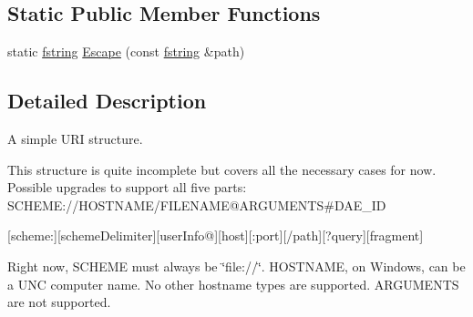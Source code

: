 \subsection*{Static Public Member Functions}
\begin{DoxyCompactItemize}
\item 
static \hyperlink{classfm_1_1stringT}{fstring} \hyperlink{classFUUri_ab0c78a1e1f48983f13aaa5d6d2337efd}{Escape} (const \hyperlink{classfm_1_1stringT}{fstring} \&path)
\end{DoxyCompactItemize}


\subsection{Detailed Description}
A simple URI structure.

This structure is quite incomplete but covers all the necessary cases for now. Possible upgrades to support all five parts: SCHEME://HOSTNAME/FILENAME@ARGUMENTS\#DAE\_\-ID

\mbox{[}scheme:\mbox{]}\mbox{[}schemeDelimiter\mbox{]}\mbox{[}userInfo@\mbox{]}\mbox{[}host\mbox{]}\mbox{[}:port\mbox{]}\mbox{[}/path\mbox{]}\mbox{[}?query\mbox{]}\mbox{[}fragment\mbox{]}

Right now, SCHEME must always be \char`\"{}file://\char`\"{}. HOSTNAME, on Windows, can be a UNC computer name. No other hostname types are supported. ARGUMENTS are not supported. 

